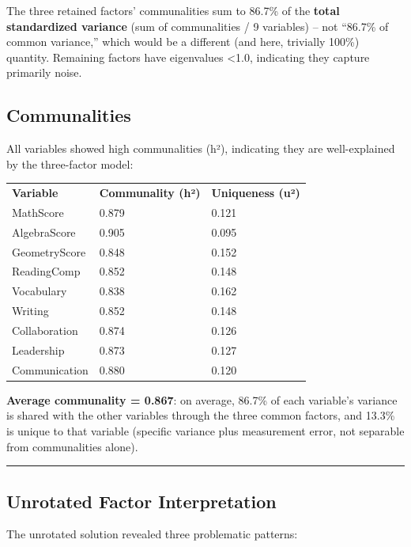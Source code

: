 \documentclass[
]{article}
\begin{document}
The three retained factors' communalities sum to 86.7\% of the
\textbf{total standardized variance} (sum of communalities / 9
variables) -- not ``86.7\% of common variance,'' which would be a
different (and here, trivially 100\%) quantity. Remaining factors have
eigenvalues \textless1.0, indicating they capture primarily noise.

\subsection{Communalities}

All variables showed high communalities (h²), indicating they are
well-explained by the three-factor model:

{\def\LTcaptype{none} %
\begin{longtable}[]{@{}lll@{}}
\toprule\noalign{}
\endhead
\bottomrule\noalign{}
\endlastfoot
\textbf{Variable} & \textbf{Communality (h²)} & \textbf{Uniqueness
(u²)} \\
MathScore & 0.879 & 0.121 \\
AlgebraScore & 0.905 & 0.095 \\
GeometryScore & 0.848 & 0.152 \\
ReadingComp & 0.852 & 0.148 \\
Vocabulary & 0.838 & 0.162 \\
Writing & 0.852 & 0.148 \\
Collaboration & 0.874 & 0.126 \\
Leadership & 0.873 & 0.127 \\
Communication & 0.880 & 0.120 \\
\end{longtable}
}

\textbf{Average communality = 0.867}: on average, 86.7\% of each
variable's variance is shared with the other variables through the three
common factors, and 13.3\% is unique to that variable (specific variance
plus measurement error, not separable from communalities alone).

\begin{center}\rule{0.5\linewidth}{0.5pt}\end{center}

\subsection{Unrotated Factor Interpretation}

The unrotated solution revealed three problematic patterns:
\end{document}
